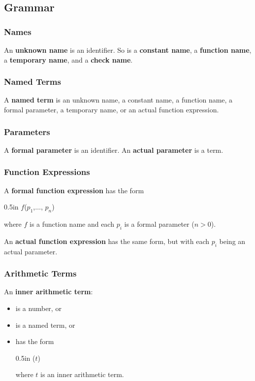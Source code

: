 \documentclass[letterpaper, 12pt]{extarticle}
\theoremstyle{definition} %
\newcommand{\textdef}[1]{\textbf{#1}}
\newenvironment{codeblock}
    {\begin{addmargin}{0.5in} \ttfamily}
    {\end{addmargin}}
\begin{document}

\subsection{Grammar}

\subsubsection{Names}

An \textdef{unknown name} is an identifier.
So is a \textdef{constant name}, a \textdef{function name},
a \textdef{temporary name}, and a \textdef{check name}.

\subsubsection{Named Terms}

A \textdef{named term} is an unknown name, a constant name,
a function name, a formal parameter, a temporary name, or
an actual function expression.

\subsubsection{Parameters}

A \textdef{formal parameter} is an identifier.
An \textdef{actual parameter} is a term.

\subsubsection{Function Expressions}

A \textdef{formal function expression} has the form
\begin{codeblock}
$f$($p_1$,$\ldots$, $p_n$)
\end{codeblock}
where $f$ is a function name and
each $p_i$ is a formal parameter ($n > 0$).

An \textdef{actual function expression} has the same form,
but with each $p_i$ being an actual parameter.

\subsubsection{Arithmetic Terms}

An \textdef{inner arithmetic term}:
\begin{itemize}
\item
is a number, or
\item
is a named term, or
\item
has the form
\begin{codeblock}
($t$)
\end{codeblock}
where $t$ is an inner arithmetic term.
\end{itemize}
\end{document}
